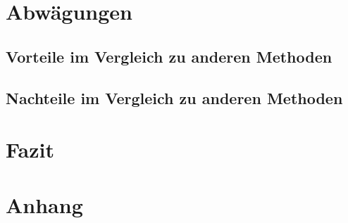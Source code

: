 \documentclass[a4paper, 12pt]{report}
\begin{document}
\begin{sloppypar}
\chapter{Abwägungen}
\section{Vorteile im Vergleich zu anderen Methoden}
\section{Nachteile im Vergleich zu anderen Methoden}
\chapter{Fazit}
\chapter{Anhang}

\printbibliography
\end{sloppypar}
\end{document}
